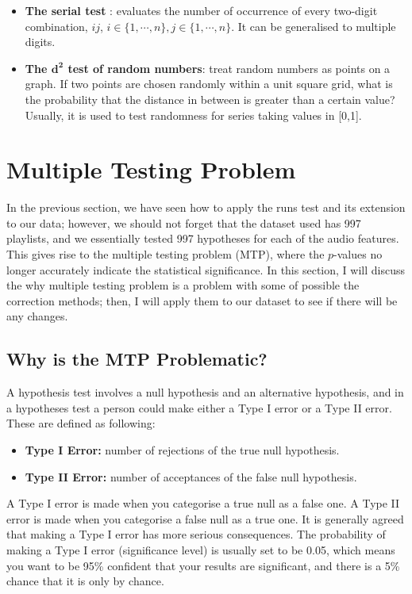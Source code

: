 \documentclass[12pt]{article}
\theoremstyle{plain}
\theoremstyle{definition}
\theoremstyle{remark}
\begin{document}
\begin{itemize}
    \item \textbf{The serial test} \cite{3.4}: evaluates the number of occurrence of every two-digit combination, $ij$, $i\in \{1,\cdots,n\},j\in \{1,\cdots,n\}$. It can be generalised to multiple digits. \cite{3.26}
    \item \textbf{The $\mathbf{d^2}$ test of random numbers}\cite{3.11}: treat random numbers as points on a graph. If two points are chosen randomly within a unit square grid, what is the probability that the distance in between is greater than a certain value? Usually, it is used to test randomness for series taking values in [0,1]. \cite{3.4}
\end{itemize}

\clearpage



\section{Multiple Testing Problem}
In the previous section, we have seen how to apply the runs test and its extension to our data; however, we should not forget that the dataset used has 997 playlists, and we essentially tested 997 hypotheses for each of the audio features. This gives rise to the multiple testing problem (MTP), where the $p$-values no longer accurately indicate the statistical significance\cite{5.2}. In this section, I will discuss the why multiple testing problem is a problem with some of possible the correction methods; then, I will apply them to our dataset to see if there will be any changes.


\subsection{Why is the MTP Problematic?}
A hypothesis test involves a null hypothesis and an alternative hypothesis, and in a hypotheses test a person could make either a Type I error or a Type II error. These are defined as following\cite{5.2}:
\begin{itemize}
    \item \textbf{Type I Error:} number of rejections of the true null hypothesis.
    \item \textbf{Type II Error:} number of acceptances of the false null hypothesis.
\end{itemize}
A Type I error is made when you categorise a true null as a false one. A Type II error is made when you categorise a false null as a true one. It is generally agreed that making a Type I error has more serious consequences.\cite{5.2} The probability of making a Type I error (significance level) is usually set to be 0.05, which means you want to be 95\% confident that your results are significant, and there is a 5\% chance that it is only by chance.\cite{5.4}
\end{document}
